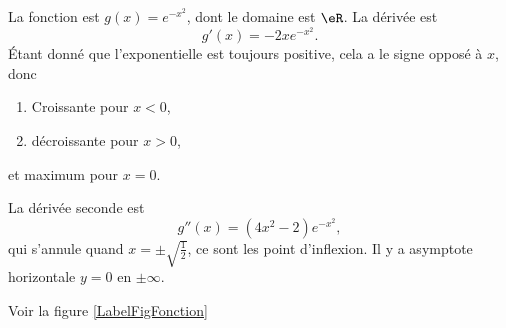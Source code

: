 \begin{corrige}{5}

La fonction est $g(x)= e^{-x^2}$, dont le domaine est $\eR$. La dérivée est
\begin{equation}
	g'(x)=-2x e^{-x^2}.
\end{equation}
Étant donné que l'exponentielle est toujours positive, cela a le signe opposé à $x$, donc
\begin{enumerate}

\item
Croissante pour $x<0$,
\item décroissante pour $x>0$,
\end{enumerate}
et maximum pour $x=0$.

La dérivée seconde est
\begin{equation}
	g''(x)=(4x^2-2) e^{-x^2},
\end{equation}
qui s'annule quand $x=\pm\sqrt{\frac{ 1 }{ 2 }}$, ce sont les point d'inflexion. Il y a asymptote horizontale  $y=0$ en $\pm\infty$.


Voir la figure \ref{LabelFigFonction}
\newcommand{\CaptionFigFonction}{La fonction de l'exercice \ref{exo5}.}



\end{corrige}
